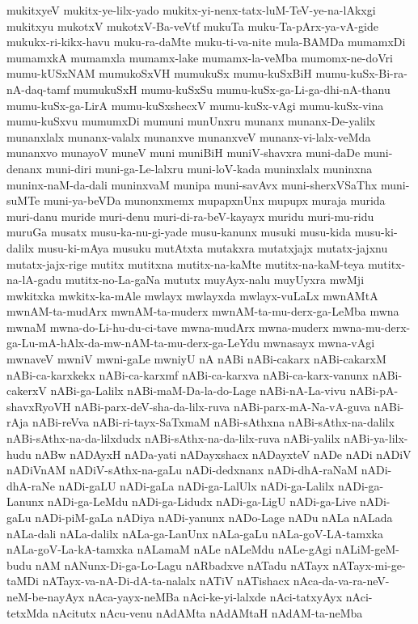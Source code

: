 {mukitxyeV
mukitx-ye-lilx-yado
mukitx-yi-nenx-tatx-luM-TeV-ye-na-lAkxgi
mukitxyu
mukotxV
mukotxV-Ba-veVtf
mukuTa
muku-Ta-pArx-ya-vA-gide
mukukx-ri-kikx-havu
muku-ra-daMte
muku-ti-va-nite
mula-BAMDa
mumamxDi
mumamxkA
mumamxla
mumamx-lake
mumamx-la-veMba
mumomx-ne-doVri
mumu-kUSxNAM
mumukoSxVH
mumukuSx
mumu-kuSxBiH
mumu-kuSx-Bi-ra-nA-daq-tamf
mumukuSxH
mumu-kuSxSu
mumu-kuSx-ga-Li-ga-dhi-nA-thanu
mumu-kuSx-ga-LirA
mumu-kuSxshecxV
mumu-kuSx-vAgi
mumu-kuSx-vina
mumu-kuSxvu
mumumxDi
mumuni
munUnxru
munanx
munanx-De-yalilx
munanxlalx
munanx-valalx
munanxve
munanxveV
munanx-vi-lalx-veMda
munanxvo
munayoV
muneV
muni
muniBiH
muniV-shavxra
muni-daDe
muni-denanx
muni-diri
muni-ga-Le-lalxru
muni-loV-kada
muninxlalx
muninxna
muninx-naM-da-dali
muninxvaM
munipa
muni-savAvx
muni-sherxVSaThx
muni-suMTe
muni-ya-beVDa
munonxmemx
mupapxnUnx
mupupx
muraja
murida
muri-danu
muride
muri-denu
muri-di-ra-beV-kayayx
muridu
muri-mu-ridu
muruGa
musatx
musu-ka-nu-gi-yade
musu-kanunx
musuki
musu-kida
musu-ki-dalilx
musu-ki-mAya
musuku
mutAtxta
mutakxra
mutatxjajx
mutatx-jajxnu
mutatx-jajx-rige
mutitx
mutitxna
mutitx-na-kaMte
mutitx-na-kaM-teya
mutitx-na-lA-gadu
mutitx-no-La-gaNa
mututx
muyAyx-nalu
muyUyxra
mwMji
mwkitxka
mwkitx-ka-mAle
mwlayx
mwlayxda
mwlayx-vuLaLx
mwnAMtA
mwnAM-ta-mudArx
mwnAM-ta-muderx
mwnAM-ta-mu-derx-ga-LeMba
mwna
mwnaM
mwna-do-Li-hu-du-ci-tave
mwna-mudArx
mwna-muderx
mwna-mu-derx-ga-Lu-mA-hAlx-da-mw-nAM-ta-mu-derx-ga-LeYdu
mwnasayx
mwna-vAgi
mwnaveV
mwniV
mwni-gaLe
mwniyU
nA
nABi
nABi-cakarx
nABi-cakarxM
nABi-ca-karxkekx
nABi-ca-karxmf
nABi-ca-karxva
nABi-ca-karx-vanunx
nABi-cakerxV
nABi-ga-Lalilx
nABi-maM-Da-la-do-Lage
nABi-nA-La-vivu
nABi-pA-shavxRyoVH
nABi-parx-deV-sha-da-lilx-ruva
nABi-parx-mA-Na-vA-guva
nABi-rAja
nABi-reVva
nABi-ri-tayx-SaTxmaM
nABi-sAthxna
nABi-sAthx-na-dalilx
nABi-sAthx-na-da-lilxdudx
nABi-sAthx-na-da-lilx-ruva
nABi-yalilx
nABi-ya-lilx-hudu
nABw
nADAyxH
nADa-yati
nADayxshacx
nADayxteV
nADe
nADi
nADiV
nADiVnAM
nADiV-sAthx-na-gaLu
nADi-dedxnanx
nADi-dhA-raNaM
nADi-dhA-raNe
nADi-gaLU
nADi-gaLa
nADi-ga-LalUlx
nADi-ga-Lalilx
nADi-ga-Lanunx
nADi-ga-LeMdu
nADi-ga-Lidudx
nADi-ga-LigU
nADi-ga-Live
nADi-gaLu
nADi-piM-gaLa
nADiya
nADi-yanunx
nADo-Lage
nADu
nALa
nALada
nALa-dali
nALa-dalilx
nALa-ga-LanUnx
nALa-gaLu
nALa-goV-LA-tamxka
nALa-goV-La-kA-tamxka
nALamaM
nALe
nALeMdu
nALe-gAgi
nALiM-geM-budu
nAM
nANunx-Di-ga-Lo-Lagu
nARbadxve
nATadu
nATayx
nATayx-mi-ge-taMDi
nATayx-va-nA-Di-dA-ta-nalalx
nATiV
nATishacx
nAca-da-va-ra-neV-neM-be-nayAyx
nAca-yayx-neMBa
nAci-ke-yi-lalxde
nAci-tatxyAyx
nAci-tetxMda
nAcitutx
nAcu-venu
nAdAMta
nAdAMtaH
nAdAM-ta-neMba
}
